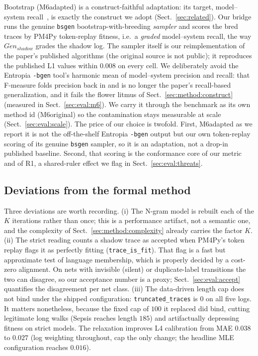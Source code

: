 \documentclass[runningheads]{llncs}
\newcommand{\chg}[1]{#1}
\newcommand{\genshadow}{\ensuremath{\mathit{Gen}_{\mathit{shadow}}}}
\begin{document}
Bootstrap (M6adapted) is a construct-faithful adaptation: its target, model--system recall~\cite{polyvyanyy2022bootstrap}, is exactly the construct we adopt (Sect.~\ref{sec:related}). Our bridge runs the genuine \texttt{bsgen} bootstrap-with-breeding \emph{sampler} and scores the bred traces by PM4Py token-replay fitness, i.e.\ a \emph{graded} model--system recall, the way \genshadow{} grades the shadow log. \chg{The sampler itself is our reimplementation of the paper's published algorithms (the original source is not public); it reproduces the published L1 values within $0.008$ on every cell.} We deliberately avoid the Entropia \texttt{-bgen} tool's harmonic mean of model--system precision and recall: that F-measure folds precision back in and is no longer the paper's recall-based generalization, and it fails the flower litmus of Sect.~\ref{sec:method:construct} (measured in Sect.~\ref{sec:eval:m6}). We carry it through the benchmark as its own method id (M6original) so the contamination stays measurable at scale (Sect.~\ref{sec:eval:scale}). The price of our choice is twofold. First, M6adapted as we report it is not the off-the-shelf Entropia \texttt{-bgen} output but our own token-replay scoring of its genuine \texttt{bsgen} sampler, so it is an adaptation, not a drop-in published baseline. Second, that scoring is the conformance core of our metric and of R1, a shared-ruler effect we flag in Sect.~\ref{sec:eval:threats}.

\subsection{Deviations from the formal method}
\label{sec:impl:deviations}
Three deviations are worth recording. (i) The N-gram model is rebuilt each of the $K$ iterations rather than once; this is a performance artifact, not a semantic one, and the complexity of Sect.~\ref{sec:method:complexity} already carries the factor $K$. (ii) The strict reading counts a shadow trace as accepted when PM4Py's token replay flags it as perfectly fitting (\texttt{trace\_is\_fit}). That flag is a fast but approximate test of language membership, which is properly decided by a cost-zero alignment. On nets with invisible (silent) or duplicate-label transitions the two can disagree, so our acceptance number is a proxy\chg{; Sect.~\ref{sec:eval:accept} quantifies the disagreement per net class}. (iii) \chg{The data-driven length cap does not bind under the shipped configuration: \texttt{truncated\_traces} is $0$ on all five logs. It matters nonetheless, because the fixed cap of $100$ it replaced did bind, cutting legitimate long walks (Sepsis reaches length $185$) and artifactually depressing fitness on strict models. The relaxation improves L4 calibration from MAE $0.038$ to $0.027$ (log weighting throughout, cap the only change; the headline MLE configuration reaches $0.016$).}
\end{document}
